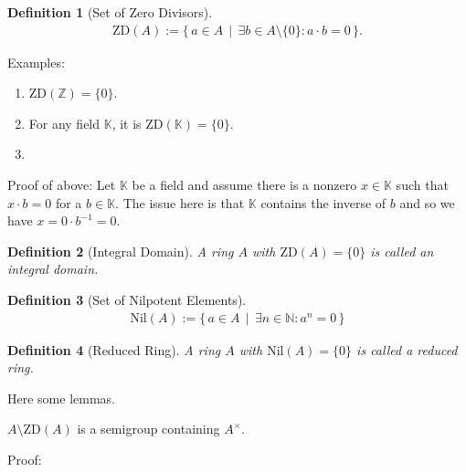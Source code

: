 \documentclass{book}
\theoremstyle{custom_definition}
\newtheorem{definition}{Definition}
\begin{document}
    \begin{definition}[Set of Zero Divisors]
        \begin{align}
            \text{ZD}(A) := \{\, a \in A \,\mid\, \exists b \in A \setminus \{0\} : a \cdot b = 0 \,\}.
        \end{align}
    \end{definition}

    Examples:
    \begin{enumerate}
        \item \(\text{ZD}(\mathbb{Z}) = \{0\}\).
        \item For any field \(\mathbb{K}\), it is \(\text{ZD}(\mathbb{K}) = \{0\}\).
        \item 
    \end{enumerate}

    Proof of above:
    Let \(\mathbb{K}\) be a field and assume there is a nonzero \(x \in \mathbb{K}\) such that \(x \cdot b = 0\) for a \(b \in \mathbb{K}\). The issue here is that \(\mathbb{K}\) contains the inverse of \(b\) and so we have \(x = 0 \cdot b^{-1} = 0\).

    \begin{definition}[Integral Domain]
        A ring \(A\) with \(\text{ZD}(A) = \{0\}\) is called an integral domain.
    \end{definition}

    \begin{definition}[Set of Nilpotent Elements]
        \begin{align}
            \text{Nil}(A) := \{\, a \in A \,\mid\, \exists n \in \mathbb{N} : a^n = 0 \,\}
        \end{align}
    \end{definition}

    \begin{definition}[Reduced Ring]
        A ring \(A\) with \(\text{Nil}(A) = \{0\}\) is called a reduced ring.
    \end{definition}


    Here some lemmas.

    \(A \setminus \text{ZD}(A)\) is a semigroup containing \(A^\times\).

    Proof:
\end{document}
